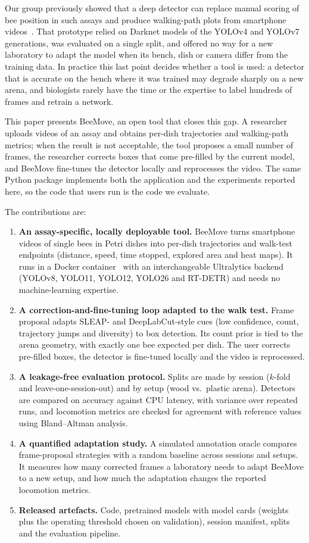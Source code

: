 \documentclass[pdflatex,sn-basic,Numbered]{sn-jnl}
\newcommand{\beemove}{BeeMove}
\theoremstyle{thmstyleone}%
\begin{document}
Our group previously showed that a deep detector can replace manual scoring of bee position in such assays and produce walking-path plots from smartphone videos~\cite{lima2025analyzing}. That prototype relied on Darknet models of the YOLOv4 and YOLOv7 generations, was evaluated on a single split, and offered no way for a new laboratory to adapt the model when its bench, dish or camera differ from the training data. In practice this last point decides whether a tool is used: a detector that is accurate on the bench where it was trained may degrade sharply on a new arena, and biologists rarely have the time or the expertise to label hundreds of frames and retrain a network.

This paper presents \beemove, an open tool that closes this gap. A researcher uploads videos of an assay and obtains per-dish trajectories and walking-path metrics; when the result is not acceptable, the tool proposes a small number of frames, the researcher corrects boxes that come pre-filled by the current model, and \beemove{} fine-tunes the detector locally and reprocesses the video. The same Python package implements both the application and the experiments reported here, so the code that users run is the code we evaluate.

The contributions are:
\begin{enumerate}
  \item \textbf{An assay-specific, locally deployable tool.} \beemove{} turns smartphone videos of single bees in Petri dishes into per-dish trajectories and walk-test endpoints (distance, speed, time stopped, explored area and heat maps). It runs in a Docker container~\cite{boettiger2015introduction} with an interchangeable Ultralytics backend (YOLOv8, YOLO11, YOLO12, YOLO26 and RT-DETR) and needs no machine-learning expertise.
  \item \textbf{A correction-and-fine-tuning loop adapted to the walk test.} Frame proposal adapts SLEAP- and DeepLabCut-style cues (low confidence, count, trajectory jumps and diversity) to box detection. Its count prior is tied to the arena geometry, with exactly one bee expected per dish. The user corrects pre-filled boxes, the detector is fine-tuned locally and the video is reprocessed.
  \item \textbf{A leakage-free evaluation protocol.} Splits are made by session ($k$-fold and leave-one-session-out) and by setup (wood vs.\ plastic arena). Detectors are compared on accuracy against CPU latency, with variance over repeated runs, and locomotion metrics are checked for agreement with reference values using Bland--Altman analysis.
  \item \textbf{A quantified adaptation study.} A simulated annotation oracle compares frame-proposal strategies with a random baseline across sessions and setups. It measures how many corrected frames a laboratory needs to adapt \beemove{} to a new setup, and how much the adaptation changes the reported locomotion metrics.
  \item \textbf{Released artefacts.} Code, pretrained models with model cards (weights plus the operating threshold chosen on validation), session manifest, splits and the evaluation pipeline.
\end{enumerate}
\end{document}
